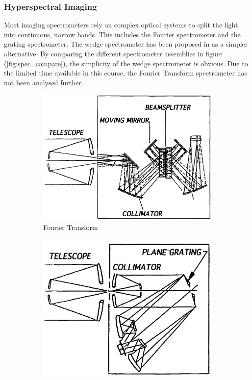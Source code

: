\subsubsection*{Hyperspectral Imaging}
Most imaging spectrometers rely on complex optical systems to split the light into continuous, narrow bands. This includes the Fourier spectrometer and the grating spectrometer. The wedge spectrometer has been proposed in \cite{puschell1999a} as a simpler alternative. By comparing the different spectrometer assemblies in figure (\ref{fig:spec_compare}), the simplicity of the wedge spectrometer is obvious. Due to the limited time available in this course, the Fourier Transform spectrometer has not been analysed further.
\begin{figure}[H]
    \centering
    \begin{subfigure}[b]{0.3\textwidth}
        \includegraphics[width=\textwidth]{figures/Orbiter/spectrometer_fourier.png}
        \caption{Fourier Transform}\label{fig:spec_fourer}
    \end{subfigure}
    \begin{subfigure}[b]{0.3\textwidth}
        \includegraphics[width=\textwidth]{figures/Orbiter/spectrometer_grating.png}

\end{subfigure}
\end{figure}
